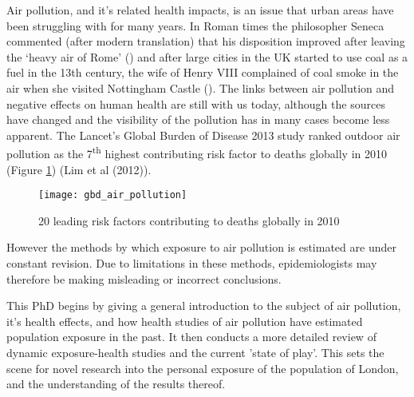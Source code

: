 Air pollution, and it's related health impacts, is an issue that urban areas have been struggling with for many years. In Roman times the philosopher Seneca commented (after modern translation) that his disposition improved after leaving the ‘heavy air of Rome’ (\cite{seneca1969}) and after large cities in the UK started to use coal as a fuel in the 13th century, the wife of Henry VIII complained of coal smoke in the air when she visited Nottingham Castle (\cite{Brimblecombe1999}). The links between air pollution and negative effects on human health are still with us today, although the sources have changed and the visibility of the pollution has in many cases become less apparent. The Lancet's Global Burden of Disease 2013 study ranked outdoor air pollution as the  7\textsuperscript{th} highest contributing risk factor to deaths globally in 2010 (Figure \ref{fig:gbd_air_pollution}) (Lim et al (2012)).\hfill

\begin{figure}[H]
\centering
\texttt{[image: gbd\_air\_pollution]}
\caption{20 leading risk factors contributing to deaths globally in 2010}
\label{fig:gbd_air_pollution}
\end{figure}

However the methods by which exposure to air pollution is estimated are under constant revision. Due to limitations in these methods, epidemiologists may therefore be making misleading or incorrect conclusions.\hfill

This PhD begins by giving a general introduction to the subject of air pollution, it's health effects, and how health studies of air pollution have estimated population exposure in the past. It then conducts a more detailed review of dynamic exposure-health studies and the current 'state of play'. This sets the scene for novel research into the personal exposure of the population of London, and the understanding of the results thereof.\hfill